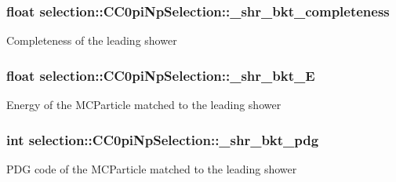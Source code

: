 \subsubsection[{\texorpdfstring{\+\_\+shr\+\_\+bkt\+\_\+completeness}{_shr_bkt_completeness}}]{\setlength{\rightskip}{0pt plus 5cm}float selection\+::\+C\+C0pi\+Np\+Selection\+::\+\_\+shr\+\_\+bkt\+\_\+completeness\hspace{0.3cm}{\ttfamily [private]}}\hypertarget{classselection_1_1CC0piNpSelection_ac3c3c9895ca501c3b73f14addfddf495}{}\label{classselection_1_1CC0piNpSelection_ac3c3c9895ca501c3b73f14addfddf495}
Completeness of the leading shower 
\subsubsection[{\texorpdfstring{\+\_\+shr\+\_\+bkt\+\_\+E}{_shr_bkt_E}}]{\setlength{\rightskip}{0pt plus 5cm}float selection\+::\+C\+C0pi\+Np\+Selection\+::\+\_\+shr\+\_\+bkt\+\_\+E\hspace{0.3cm}{\ttfamily [private]}}\hypertarget{classselection_1_1CC0piNpSelection_aa1a21f48d99a4de5f1d444aa3d64dedf}{}\label{classselection_1_1CC0piNpSelection_aa1a21f48d99a4de5f1d444aa3d64dedf}
Energy of the M\+C\+Particle matched to the leading shower 
\subsubsection[{\texorpdfstring{\+\_\+shr\+\_\+bkt\+\_\+pdg}{_shr_bkt_pdg}}]{\setlength{\rightskip}{0pt plus 5cm}int selection\+::\+C\+C0pi\+Np\+Selection\+::\+\_\+shr\+\_\+bkt\+\_\+pdg\hspace{0.3cm}{\ttfamily [private]}}\hypertarget{classselection_1_1CC0piNpSelection_aab09f93d7cd57031de714956414f3230}{}\label{classselection_1_1CC0piNpSelection_aab09f93d7cd57031de714956414f3230}
P\+DG code of the M\+C\+Particle matched to the leading shower 
